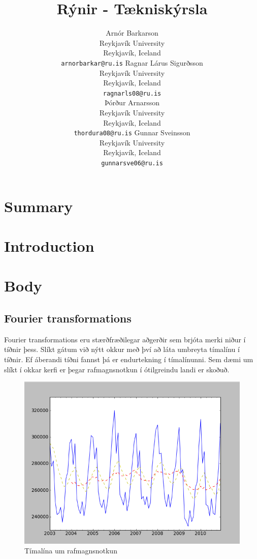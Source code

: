 \documentclass[11pt]{article}
\title{Rýnir - Tækniskýrsla}
\author{Arnór Barkarson\\
  Reykjavík University\\
  Reykjavík, Iceland\\
  {\tt arnorbarkar@ru.is}  \And  
  Ragnar Lárus Sigurðsson\\
  Reykjavík University\\
  Reykjavík, Iceland\\
  {\tt  ragnarls08@ru.is}\\ \And 
  Þórður Arnarsson\\
  Reykjavík University\\
  Reykjavík, Iceland\\
  {\tt  thordura08@ru.is}  \And 
  Gunnar Sveinsson\\
  Reykjavík University\\
  Reykjavík, Iceland\\
  {\tt  gunnarsve06@ru.is} 
}
\date{}
\begin{document}
\maketitle


\section{Summary}
\section{Introduction}
\section{Body}
\subsection{Fourier transformations}
Fourier transformations eru stærðfræðilegar aðgerðir sem brjóta merki niður í tíðnir þess. Slíkt gátum við nýtt okkur með því að láta umbreyta 
tímalínu í tíðnir. Ef áberandi tíðni fannst þá er endurtekning í tímalínunni. Sem dæmi um slíkt í okkar kerfi er þegar 
rafmagnsnotkun í ótilgreindu landi er skoðuð.\\

\begin{figure}
 \begin{center}
 \includegraphics[width=.45\textwidth]{Rafmagnsnotkun.png}
 \caption{Tímalína um rafmagnsnotkun}
  \end{center}
\end{figure}
\hfill
\\\\\\\\\\\\\\\\\\\\\\\\\\\\\\\\\\\
\end{document}
